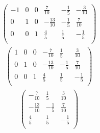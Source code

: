 \documentclass{article}
\begin{document}
\begin{align*}
\left(
\begin{array}{ccccc|c}
-1 & 0 & 0 & \frac{7}{10} & -\frac{1}{5} & -\frac{3}{10}\\
0 & 1 & 0 & -\frac{13}{10} & -\frac{1}{5} & \frac{7}{10}\\
0 & 0 & 1 & \frac{4}{5} & \frac{1}{5} & -\frac{1}{5}\\
\end{array}
\right)
\end{align*}
\begin{align*}
\left(
\begin{array}{ccccc|c}
1 & 0 & 0 & -\frac{7}{10} & \frac{1}{5} & \frac{3}{10}\\
0 & 1 & 0 & -\frac{13}{10} & -\frac{1}{5} & \frac{7}{10}\\
0 & 0 & 1 & \frac{4}{5} & \frac{1}{5} & -\frac{1}{5}\\
\end{array}
\right)
\end{align*}
\begin{align*}
\begin{pmatrix}
-\frac{7}{10} & \frac{1}{5} & \frac{3}{10}\\
-\frac{13}{10} & -\frac{1}{5} & \frac{7}{10}\\
\frac{4}{5} & \frac{1}{5} & -\frac{1}{5}\\
\end{pmatrix}
\end{align*}
\\
\end{document}
